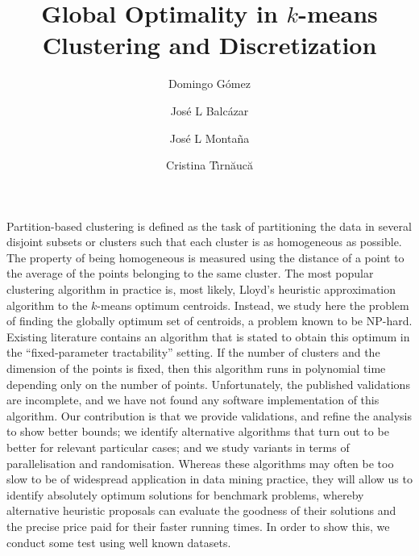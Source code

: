 \documentclass{article}
\title{Global Optimality in $k$-means Clustering and Discretization}
\author{Domingo G\'omez \and Jos\'e L Balc\'azar 
\and Jos\'e L Monta\~na \and Cristina T\^\i{}rn\u{a}uc\u{a}}
\begin{document}
\maketitle
 Partition-based clustering is defined as the task of partitioning 
the data in several disjoint subsets or clusters such that
each cluster is as homogeneous as possible. The property of being 
homogeneous is measured using the distance of a point to the average
of the points belonging to the same cluster.
The most popular clustering algorithm in practice is, most likely,
Lloyd's heuristic approximation algorithm to the $k$-means optimum
centroids. Instead, we study here the problem of finding the globally
optimum set of centroids, a problem known to be NP-hard. Existing
literature contains an algorithm that is stated to obtain this
optimum in the ``fixed-parameter tractability'' setting. If the 
number of clusters and the dimension of the points is fixed, 
then this algorithm runs in polynomial time depending only on the
number of points. Unfortunately, the published validations are 
incomplete, and we have not found any software implementation of this algorithm.
Our contribution is that we provide validations, and refine the 
analysis to show better bounds; we identify alternative algorithms 
that turn out to be
better for relevant particular cases; and we study variants in
terms of parallelisation and randomisation. Whereas these 
algorithms may often be too slow to be of widespread application 
in data mining practice, they will allow us to identify absolutely 
optimum solutions for benchmark problems, whereby alternative heuristic 
proposals can evaluate the goodness of their solutions and the
precise price paid for their faster running times. In order to 
show this, we conduct some test using well known datasets.
\end{document}
